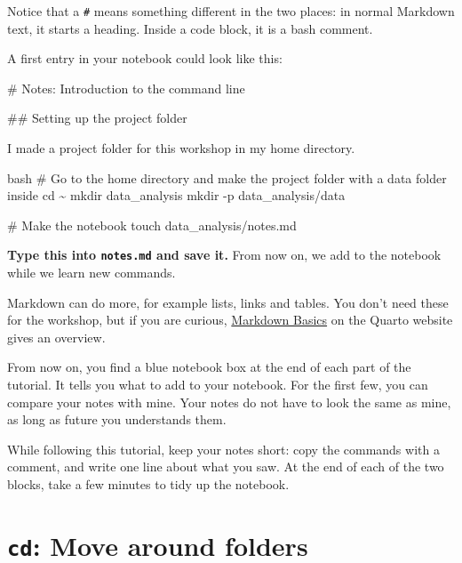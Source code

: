 \documentclass[
  letterpaper,
  DIV=11,
  numbers=noendperiod]{scrreprt}
\newenvironment{Shaded}{}{}
\newcommand{\AttributeTok}[1]{\textcolor[rgb]{0.84,0.23,0.29}{#1}}
\newcommand{\BuiltInTok}[1]{\textcolor[rgb]{0.84,0.23,0.29}{#1}}
\newcommand{\CommentTok}[1]{\textcolor[rgb]{0.42,0.45,0.49}{#1}}
\newcommand{\FunctionTok}[1]{\textcolor[rgb]{0.44,0.26,0.76}{#1}}
\newcommand{\InformationTok}[1]{\textcolor[rgb]{0.42,0.45,0.49}{#1}}
\newcommand{\NormalTok}[1]{\textcolor[rgb]{0.14,0.16,0.18}{#1}}
\begin{document}
Notice that a \texttt{\#} means something different in the two places:
in normal Markdown text, it starts a heading. Inside a code block, it is
a bash comment.

A first entry in your notebook could look like this:

\begin{Shaded}
\begin{Highlighting}[]
\FunctionTok{\# Notes: Introduction to the command line}

\FunctionTok{\#\# Setting up the project folder}

\NormalTok{I made a project folder for this workshop in my home directory.}

\InformationTok{\textasciigrave{}\textasciigrave{}\textasciigrave{}bash}
\CommentTok{\# Go to the home directory and make the project folder with a data folder inside}
\BuiltInTok{cd}\NormalTok{ \textasciitilde{}}
\FunctionTok{mkdir}\NormalTok{ data\_analysis}
\FunctionTok{mkdir} \AttributeTok{{-}p}\NormalTok{ data\_analysis/data}

\CommentTok{\# Make the notebook}
\FunctionTok{touch}\NormalTok{ data\_analysis/notes.md}
\InformationTok{\textasciigrave{}\textasciigrave{}\textasciigrave{}}
\end{Highlighting}
\end{Shaded}

\textbf{Type this into \texttt{notes.md} and save it.} From now on, we
add to the notebook while we learn new commands.

Markdown can do more, for example lists, links and tables. You don't
need these for the workshop, but if you are curious,
\href{https://quarto.org/docs/authoring/markdown-basics.html}{Markdown
Basics} on the Quarto website gives an overview.

From now on, you find a blue notebook box at the end of each part of the
tutorial. It tells you what to add to your notebook. For the first few,
you can compare your notes with mine. Your notes do not have to look the
same as mine, as long as future you understands them.

While following this tutorial, keep your notes short: copy the commands
with a comment, and write one line about what you saw. At the end of
each of the two blocks, take a few minutes to tidy up the notebook.

\section{\texorpdfstring{\texttt{cd}: Move around
folders}{cd: Move around folders}}\label{cd-move-around-folders}
\end{document}
